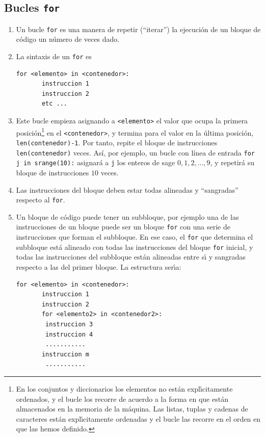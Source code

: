 \subsection{Bucles {\tt for}}\label{bfor}
\begin{enumerate}
\item Un bucle \lstinline|for| es una manera de repetir (``iterar'') la
ejecución de
un bloque de c\'odigo un {\sc n\'umero de veces dado.}
\item La sintaxis de un \lstinline|for| es \label{for-sintaxis1}
\begin{lstlisting}
for <elemento> in <contenedor>:
       instruccion 1
       instruccion 2
       etc ...
\end{lstlisting}

\item  Este bucle empieza asignando a \lstinline|<elemento>| el valor que ocupa
la
primera posici\'on\footnote{En los conjuntos y diccionarios los elementos no
est\'an expl\'{\i}citamente ordenados, y el bucle los recorre de acuerdo a la
forma en que est\'an almacenados en la memoria de la m\'aquina. Las listas,
tuplas y cadenas de caracteres est\'an expl\'{\i}citamente ordenadas y el bucle
las recorre en el orden en que las hemos definido.} en el
\lstinline|<contenedor>|, y termina para el valor
en la \'ultima posición, \lstinline|len(contenedor)-1|.
Por tanto, repite el bloque de instrucciones \lstinline|len(contenedor)| veces.
Así, por ejemplo, un bucle con línea de entrada 
\lstinline|for j in srange(10):|
asignará a \lstinline|j| los enteros de sage $0,1,2,...,9$, y 
repetirá su bloque de instrucciones $10$ veces.

\item Las instrucciones del bloque  {\sc deben estar todas alineadas} y
``sangradas'' respecto al \lstinline|for|.

\item Un bloque de c\'odigo puede tener un subbloque, por ejemplo una de las
instrucciones de un bloque puede ser un bloque {\tt for} con una serie de
instrucciones que forman el subbloque. En ese caso, el {\tt for} que determina
el subbloque est\'a alineado con todas las instrucciones del bloque {\tt for}
inicial, y todas las instrucciones del subbloque est\'an alineadas entre s\'{\i}
y sangradas respecto a las del primer bloque. La estructura ser\'{\i}a:

\begin{lstlisting}
for <elemento> in <contenedor>:
       instruccion 1
       instruccion 2
       for <elemento2> in <contenedor2>:
		instruccion 3
		instruccion 4
		...........
       instruccion m
        ...........
\end{lstlisting}


\end{enumerate}
